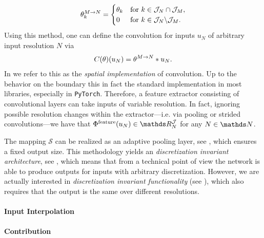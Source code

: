 %
\begin{align*}
\theta^{M \rightarrow N}_k = 
\begin{cases}
\theta_k & \text{for } k \in \mathcal{J}_N \cap \mathcal{J}_M,\\
0 & \text{for } k \in \mathcal{J}_N \backslash \mathcal{J}_M.
\end{cases}
\end{align*}
%
Using this method, one can define the convolution for inputs $u_N$ of arbitrary input resolution $N$ via
%
\begin{align*}
C(\theta)(u_N)= \theta^{M \rightarrow N} \ast u_N.
\end{align*}
%
In \cite{kabri2023resolution} we refer to this as the \emph{spatial implementation} of convolution. Up to the behavior on the boundary this in fact the standard implementation in most libraries, especially in \texttt{PyTorch}. Therefore, a feature extractor consisting of convolutional layers can take inputs of variable resolution. In fact, ignoring possible resolution changes within the extractor---i.e. via pooling or strided convolutions---we have that $\Phi^{\text{feature}}(\img_N)\in \R^{\mathcal{J}}_N$ for any $N\in\N$.

The mapping $\mathcal{S}$ can be realized as an adaptive pooling layer, see \cite{paszke2019pytorch}, which ensures a fixed output size. This methodology yields an \emph{discretization invariant architecture}, see \cite{kabri2022FNO, kovachki2021universal, li2020fourier}, which means that from a technical point of view the network is able to produce outputs for inputs with arbitrary discretization. However, we are actually interested in \emph{discretization invariant functionality} (see \cite{kabri2022FNO, kovachki2021universal, li2020fourier}), which also requires that the output is the same over different resolutions.
%
\paragraph{Input Interpolation}
%
%
\paragraph{Contribution}
%
%

%
%
